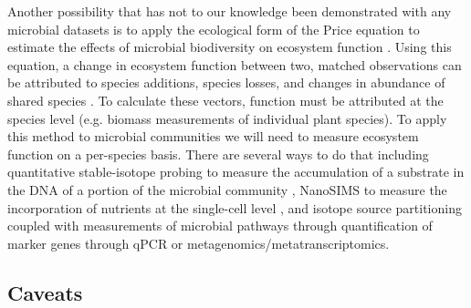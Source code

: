 \documentclass{article}
\begin{document}
Another possibility that has not to our knowledge been demonstrated with any
microbial datasets is to apply the ecological form of the Price equation to
estimate the effects of microbial biodiversity on ecosystem function
\citep{fox2006, bannar-martin2018}. Using this equation, a change in ecosystem function between two, matched
observations can be attributed to species additions, species losses, and
changes in abundance of shared species \citep{fox2006,
bannar-martin2018}. To
calculate these vectors, function must be attributed at the species level (e.g.
biomass measurements of individual plant species). To apply this method to
microbial communities we will need to measure ecosystem function on a
per-species basis. There are several ways to do that including quantitative stable-isotope
probing to measure the accumulation of a substrate in the DNA of a portion of
the microbial community \citep{hungate2015}, NanoSIMS to measure the incorporation of nutrients at
the single-cell level \citep{mayali2012}, and isotope source partitioning coupled with measurements
of microbial pathways through quantification of marker genes through qPCR or
metagenomics/metatranscriptomics.

\subsection{Caveats}
\end{document}
